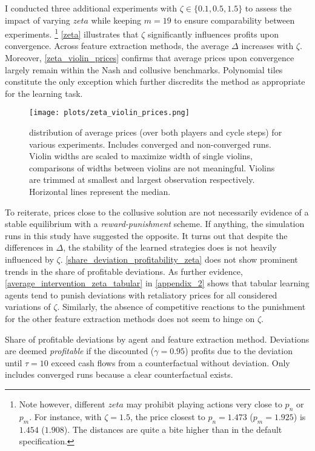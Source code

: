 I conducted three additional experiments with $\zeta \in \{0.1, 0.5, 1.5\}$ to assess the impact of varying $zeta$ while keeping $m=19$ to ensure comparability between experiments. \footnote{Note however, different $zeta$ may prohibit playing actions very close to $p_n$ or $p_m$. For instance, with $\zeta = 1.5$, the price closest to $p_n = 1.473$ ($p_m = 1.925$) is $1.454$ ($1.908$). The distances are quite a bite higher than in the default specification.} \autoref{zeta} illustrates that $\zeta$ significantly influences profits upon convergence. Across feature extraction methods, the average $\Delta$ increases with $\zeta$. Moreover, \autoref{zeta_violin_prices} confirms that average prices upon convergence largely remain within the Nash and collusive benchmarks. Polynomial tiles constitute the only exception which further discredits the method as appropriate for the learning task.

\begin{figure}
	\texttt{[image: plots/zeta\_violin\_prices.png]}
	\caption{distribution of average prices (over both players and cycle steps) for various experiments. Includes converged and non-converged runs. Violin widths are scaled to maximize width of single violins, comparisons of widths between violins are not meaningful. Violins are trimmed at smallest and largest observation respectively. Horizontal lines represent the median.}
	\label{zeta_violin_prices}
\end{figure}

To reiterate, prices close to the collusive solution are not necessarily evidence of a stable equilibrium with a \emph{reward-punishment} scheme. If anything, the simulation runs in this study have suggested the opposite. It turns out that despite the differences in $\Delta$, the stability of the learned strategies does is not heavily influenced by $\zeta$. \autoref{share_deviation_profitability_zeta} does not show prominent trends in the share of profitable deviations. As further evidence, \autoref{average_intervention_zeta_tabular} in \autoref{appendix_2} shows that tabular learning agents tend to punish deviations with retaliatory prices for all considered variations of $\zeta$. Similarly, the absence of competitive reactions to the punishment for the other feature extraction methods does not seem to hinge on $\zeta$.

\begin{center}
	\begin{table}
		
		\caption{Share of profitable deviations by agent and feature extraction method. Deviations are deemed \emph{profitable} if the discounted ($\gamma = 0.95$) profits due to the deviation until $\tau = 10$  exceed cash flows from a counterfactual without deviation. Only includes converged runs because a clear counterfactual exists.}
		\label{share_deviation_profitability_zeta}
	\end{table}
\end{center}




